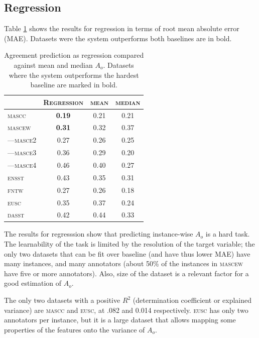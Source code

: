 \documentclass[11pt,a4paper]{article}
\begin{document}
\subsection{Regression}
\label{sec:reg}
Table \ref{tab:regagr_results} shows the results for regression in terms of root mean absolute error (MAE). Datasets were the system outperforms both baselines are in bold.


\begin{table}[Ht!]

\begin{center}
  \begin{tabular}{lc|cc}
 \toprule
 & \textsc{Regression} & \textsc{mean} & \textsc{median} \\
 \midrule
 \textsc{mascc} & \textbf{0.19} & 0.21 & 0.21 \\
 \textsc{mascew} & \textbf{0.31} & 0.32 & 0.37 \\
---\textsc{masce2} & {0.27} & 0.26 & 0.25 \\
---\textsc{masce3} & {0.36} & 0.29 & 0.20 \\
---\textsc{masce4} & {0.46} & 0.40 & 0.27 \\
\textsc{ensst} & {0.43} & 0.35 & 0.31 \\
\textsc{fntw} & {0.27} & 0.26 & 0.18 \\

\textsc{eusc} & 0.35 & 0.37 & 0.24 \\
\textsc{dasst} & 0.42 & 0.44 & 0.33 \\

\bottomrule

  \end{tabular}  
\end{center}
\caption{Agreement prediction as regression compared against mean and median $A_o$. Datasets where the system outperforms the hardest baseline are marked in bold. \label{tab:regagr_results}}
\end{table} 

The results for regresssion show that predicting instance-wise $A_o$ is a hard task. The learnability of the task is limited by the resolution of the target variable; the only two datasets that can be fit over baseline (and have thus lower MAE) have many instances, and many annotators (about 50\% of the instances in \textsc{mascew} have five or more annotators). Also, size of the dataset is a relevant factor for a good estimation of $A_o$.

The only two datasets with a positive $R^2$ (determination coefficient or explained variance)  are \textsc{mascc} and \textsc{eusc}, at .082 and 0.014 respectively. \textsc{eusc} has only two annotators per instance, but it is a large dataset that allows mapping some properties of the features onto the variance of $A_o$.
\end{document}
